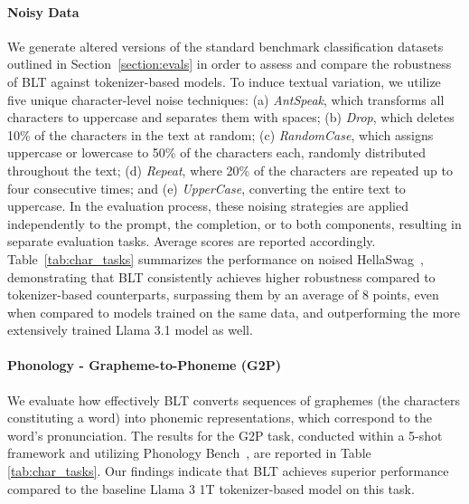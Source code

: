 \paragraph{Noisy Data} We generate altered versions of the standard benchmark classification datasets outlined in Section~\ref{section:evals} in order to assess and compare the robustness of {\textsc BLT} against tokenizer-based models. To induce textual variation, we utilize five unique character-level noise techniques: (a) \textit{AntSpeak}, which transforms all characters to uppercase and separates them with spaces; (b) \textit{Drop}, which deletes 10\% of the characters in the text at random; (c) \textit{RandomCase}, which assigns uppercase or lowercase to 50\% of the characters each, randomly distributed throughout the text; (d) \textit{Repeat}, where 20\% of the characters are repeated up to four consecutive times; and (e) \textit{UpperCase}, converting the entire text to uppercase. In the evaluation process, these noising strategies are applied independently to the prompt, the completion, or to both components, resulting in separate evaluation tasks. Average scores are reported accordingly. Table~\ref{tab:char_tasks} summarizes the performance on noised HellaSwag~\citep{Eval_hellaswag}, demonstrating that {\textsc BLT} consistently achieves higher robustness compared to tokenizer-based counterparts, surpassing them by an average of 8 points, even when compared to models trained on the same data, and outperforming the more extensively trained Llama 3.1 model as well.

\paragraph{Phonology - Grapheme-to-Phoneme (G2P)} We evaluate how effectively {\textsc BLT} converts sequences of graphemes (the characters constituting a word) into phonemic representations, which correspond to the word’s pronunciation. The results for the G2P task, conducted within a 5-shot framework and utilizing Phonology Bench~\citep{suvarna2024phonologybench}, are reported in Table \ref{tab:char_tasks}. Our findings indicate that {\textsc BLT} achieves superior performance compared to the baseline Llama 3 1T tokenizer-based model on this task.

